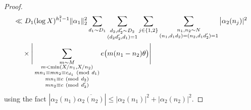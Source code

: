 \documentclass[12pt]{amsart}
\numberwithin{equation}{section}
\theoremstyle{remark}
\theoremstyle{definition}
\newcommand{\imod}[1]{\ (\mathrm{mod}\ #1)}
\begin{document}
\begin{proof}
\begin{align}
\notag \ll &~ D_1(\log X)^{h_1^2-1}\|{\alpha}_1\|_2^2\sum_{d_1\sim D_1}\sum_{\substack{d_2, d_2'\sim D_2\\(d_2d_2', d_1)=1}}\sum_{j\in \{1, 2\}}\sum_{\substack{n_1, n_2\sim N\\(n_1, d_1d_2)=(n_2, d_1d_2')=1 }}\big|{\alpha}_2(n_j)|^2\\
\notag &\times \Bigg|\sum_{\substack{m\sim M\\m< \min (X/n_1, X/n_2)\\mn_1\equiv mn_2\equiv c_{d_1}\imod {d_1}\\mn_1\equiv c\imod {d_2}\\mn_2\equiv c\imod {d_2'}}}e\big(m(n_1-n_2)\theta\big)\Bigg|
\end{align}
using the fact $|{\alpha}_2(n_1)\overline{{\alpha}_2(n_2)}|\leq |{\alpha}_2(n_1)|^2 + |{\alpha}_2(n_2)|^2$. 


\end{proof}
\end{document}
